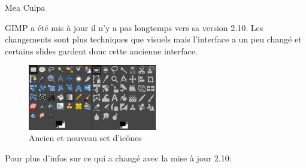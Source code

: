 \documentclass[10pt,svgnames,usenames,table]{beamer}
\begin{document}
\begin{frame}{Mea Culpa}
	\begin{center}
	GIMP a été mis à jour il n'y a pas longtemps vers sa version 2.10.
	Les changements sont plus techniques que visuels mais l'interface a un 
	peu changé et certains slides gardent donc cette ancienne interface.

	\begin{figure}
	    \centering
	    \includegraphics[width=0.50\textwidth]{Images/28to210_icons}
	    \caption{Ancien et nouveau set d'icônes}
	\end{figure} 
	Pour plus d'infos sur ce qui a changé avec la mise à jour 2.10:
	\end{center}
\end{frame}
\end{document}
